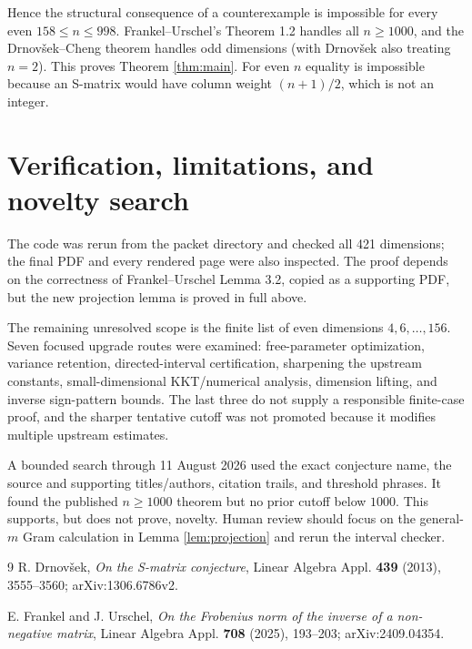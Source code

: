 \documentclass[10pt]{article}
\begin{document}
Hence the structural consequence of a counterexample is impossible for every
even $158\le n\le998$.  Frankel--Urschel's Theorem 1.2 handles all
$n\ge1000$, and the Drnov\v{s}ek--Cheng theorem handles odd dimensions (with
Drnov\v{s}ek also treating $n=2$).  This proves Theorem \ref{thm:main}.
For even $n$ equality is impossible because an S-matrix would have column
weight $(n+1)/2$, which is not an integer.

\section*{Verification, limitations, and novelty search}

The code was rerun from the packet directory and checked all 421 dimensions;
the final PDF and every rendered page were also inspected.  The proof depends
on the correctness of Frankel--Urschel Lemma 3.2, copied as a supporting PDF,
but the new projection lemma is proved in full above.

The remaining unresolved scope is the finite list of even dimensions
$4,6,\ldots,156$.  Seven focused upgrade routes were examined: free-parameter
optimization, variance retention, directed-interval certification, sharpening
the upstream constants, small-dimensional KKT/numerical analysis, dimension
lifting, and inverse sign-pattern bounds.  The last three do not supply a
responsible finite-case proof, and the sharper tentative cutoff was not
promoted because it modifies multiple upstream estimates.

A bounded search through 11 August 2026 used the exact conjecture name, the
source and supporting titles/authors, citation trails, and threshold phrases.
It found the published $n\ge1000$ theorem but no prior cutoff below $1000$.
This supports, but does not prove, novelty.  Human review should focus on the
general-$m$ Gram calculation in Lemma \ref{lem:projection} and rerun the
interval checker.

\begin{thebibliography}{9}
R. Drnov\v{s}ek,
\emph{On the S-matrix conjecture},
Linear Algebra Appl. \textbf{439} (2013), 3555--3560;
arXiv:1306.6786v2.

E. Frankel and J. Urschel,
\emph{On the Frobenius norm of the inverse of a non-negative matrix},
Linear Algebra Appl. \textbf{708} (2025), 193--203;
arXiv:2409.04354.
\end{thebibliography}
\end{document}

